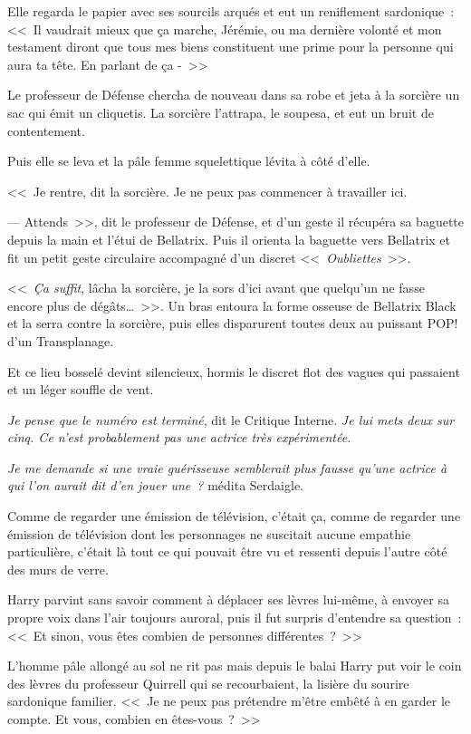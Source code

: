 Elle regarda le papier avec ses sourcils arqués et eut un reniflement sardonique~: <<~Il vaudrait mieux que ça marche, Jérémie, ou ma dernière volonté et mon testament diront que tous mes biens constituent une prime pour la personne qui aura ta tête. En parlant de ça -~>>

Le professeur de Défense chercha de nouveau dans sa robe et jeta à la sorcière un sac qui émit un cliquetis. La sorcière l'attrapa, le soupesa, et eut un bruit de contentement.

Puis elle se leva et la pâle femme squelettique lévita à côté d'elle.

<<~Je rentre, dit la sorcière. Je ne peux pas commencer à travailler ici.

--- Attends~>>, dit le professeur de Défense, et d'un geste il récupéra sa baguette depuis la main et l'étui de Bellatrix. Puis il orienta la baguette vers Bellatrix et fit un petit geste circulaire accompagné d'un discret <<~\emph{Oubliettes}~>>.

<<~\emph{Ça suffit}, lâcha la sorcière, je la sors d'ici avant que quelqu'un ne fasse encore plus de dégâts…~>>. Un bras entoura la forme osseuse de Bellatrix Black et la serra contre la sorcière, puis elles disparurent toutes deux au puissant POP! d'un Transplanage.

Et ce lieu bosselé devint silencieux, hormis le discret flot des vagues qui passaient et un léger souffle de vent.

\emph{Je pense que le numéro est terminé}, dit le Critique Interne. \emph{Je lui mets deux sur cinq. Ce n'est probablement pas une actrice très expérimentée.}

\emph{Je me demande si une vraie guérisseuse semblerait plus fausse qu'une actrice à qui l'on aurait dit d'en jouer une~?} médita Serdaigle.

Comme de regarder une émission de télévision, c'était ça, comme de regarder une émission de télévision dont les personnages ne suscitait aucune empathie particulière, c'était là tout ce qui pouvait être vu et ressenti depuis l'autre côté des murs de verre.

Harry parvint sans savoir comment à déplacer ses lèvres lui-même, à envoyer sa propre voix dans l'air toujours auroral, puis il fut surpris d'entendre sa question~: <<~Et sinon, vous êtes combien de personnes différentes~?~>>

L'homme pâle allongé au sol ne rit pas mais depuis le balai Harry put voir le coin des lèvres du professeur Quirrell qui se recourbaient, la lisière du sourire sardonique familier. <<~Je ne peux pas prétendre m'être embêté à en garder le compte. Et vous, combien en êtes-vous~?~>>

